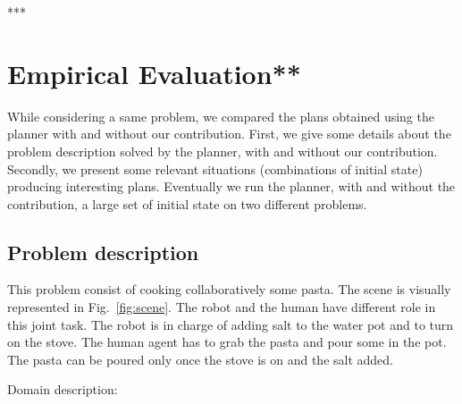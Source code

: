 \documentclass[letterpaper]{article} %
\begin{document}
***

\section{Empirical Evaluation**}


While considering a same problem, we compared the plans obtained using the planner with and without our contribution. First, we give some details about the problem description solved by the planner, with and without our contribution. Secondly, we present some relevant situations (combinations of initial state) producing interesting plans. Eventually we run the planner, with and without the contribution, a large set of initial state on two different problems.  

\subsection{Problem description}

This problem consist of cooking collaboratively some pasta. The scene is visually represented in Fig.~\ref{fig:scene}.
The robot and the human have different role in this joint task. The robot is in charge of adding salt to the water pot and to turn on the stove. The human agent has to grab the pasta and pour some in the pot. The pasta can be poured only once the stove is on and the salt added. 

Domain description:
\end{document}
